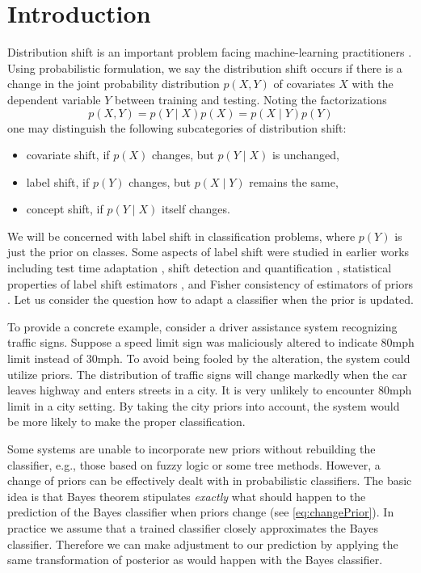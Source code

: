 \section{Introduction}



Distribution shift is an important problem facing machine-learning practitioners 
\cite{zhang2023dive, sugiyama2007covariate}.  Using probabilistic formulation, we say the distribution shift occurs if there is a change  in the joint probability distribution $p(X,Y)$ of covariates $X$ with the dependent variable $Y$  between training and testing. Noting the factorizations 
$$
p(X,Y) = p(Y\mid X)p(X) = p(X \mid Y )p(Y)
$$
one may distinguish the following subcategories of distribution shift:
\begin{itemize}
	\item covariate shift, if $p(X)$ changes, but $p(Y\mid X)$ is unchanged,
	\item label shift, if $p(Y)$ changes, but $p(X \mid Y)$ remains the same,
	\item concept shift, if $p(Y \mid X)$ itself changes.
\end{itemize}

We will be concerned with label shift in classification problems, where $p(Y)$ 
is just the prior on classes.  Some aspects of label shift were studied in
earlier works including test time adaptation
\cite{vsipka2022hitchhiker}, shift detection and quantification 
\cite{lipton2018detecting}, 
statistical properties of label shift estimators \cite{garg2020unified}, 
and Fisher consistency of estimators of priors \cite{tasche2017fisher}. 
Let us consider  the question 
how to adapt a classifier when the  prior is updated.

To provide a concrete example, consider a driver assistance system recognizing traffic signs. 
Suppose a speed limit sign was maliciously altered to indicate 80mph limit instead of 30mph.
To avoid being fooled by the alteration, the system could utilize priors.
The distribution of traffic signs will change markedly when the car leaves highway and enters streets in a city.
It is very unlikely to encounter 80mph limit in a city setting. By taking 
the city priors  into account, the system would be more likely to make the proper classification. 

Some systems are unable to incorporate new priors without rebuilding 
the classifier, e.g., those based 
on fuzzy logic or some tree methods. 
However, a change of priors can be effectively dealt with in probabilistic 
classifiers. The basic idea is that Bayes theorem stipulates \emph{exactly} 
what should happen  to the prediction of the  Bayes classifier when priors 
change (see \eqref{eq:changePrior}).  In practice we assume that a trained 
classifier closely approximates the Bayes classifier. Therefore we can make 
adjustment to our prediction by applying the same transformation of posterior 
as would happen with the Bayes classifier. 

